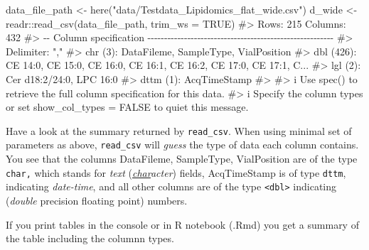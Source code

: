 \documentclass[
  letterpaper,
  DIV=11,
  numbers=noendperiod]{scrreprt}
\newenvironment{Shaded}{\begin{snugshade}}{\end{snugshade}}
\newcommand{\AttributeTok}[1]{\textcolor[rgb]{0.40,0.45,0.13}{#1}}
\newcommand{\CommentTok}[1]{\textcolor[rgb]{0.37,0.37,0.37}{#1}}
\newcommand{\ConstantTok}[1]{\textcolor[rgb]{0.56,0.35,0.01}{#1}}
\newcommand{\FunctionTok}[1]{\textcolor[rgb]{0.28,0.35,0.67}{#1}}
\newcommand{\NormalTok}[1]{\textcolor[rgb]{0.00,0.23,0.31}{#1}}
\newcommand{\OtherTok}[1]{\textcolor[rgb]{0.00,0.23,0.31}{#1}}
\newcommand{\SpecialCharTok}[1]{\textcolor[rgb]{0.37,0.37,0.37}{#1}}
\newcommand{\StringTok}[1]{\textcolor[rgb]{0.13,0.47,0.30}{#1}}
\begin{document}
\begin{Shaded}
\begin{Highlighting}[]
\NormalTok{data\_file\_path }\OtherTok{\textless{}{-}} \FunctionTok{here}\NormalTok{(}\StringTok{"data/Testdata\_Lipidomics\_flat\_wide.csv"}\NormalTok{)}
\NormalTok{d\_wide }\OtherTok{\textless{}{-}}\NormalTok{ readr}\SpecialCharTok{::}\FunctionTok{read\_csv}\NormalTok{(data\_file\_path, }\AttributeTok{trim\_ws =} \ConstantTok{TRUE}\NormalTok{)}
\CommentTok{\#\textgreater{} Rows: 215 Columns: 432}
\CommentTok{\#\textgreater{} {-}{-} Column specification {-}{-}{-}{-}{-}{-}{-}{-}{-}{-}{-}{-}{-}{-}{-}{-}{-}{-}{-}{-}{-}{-}{-}{-}{-}{-}{-}{-}{-}{-}{-}{-}{-}{-}{-}{-}{-}{-}{-}{-}{-}{-}{-}{-}{-}{-}{-}{-}{-}{-}{-}{-}{-}{-}{-}{-}}
\CommentTok{\#\textgreater{} Delimiter: ","}
\CommentTok{\#\textgreater{} chr    (3): DataFileme, SampleType, VialPosition}
\CommentTok{\#\textgreater{} dbl  (426): CE 14:0, CE 15:0, CE 16:0, CE 16:1, CE 16:2, CE 17:0, CE 17:1, C...}
\CommentTok{\#\textgreater{} lgl    (2): Cer d18:2/24:0, LPC 16:0}
\CommentTok{\#\textgreater{} dttm   (1): AcqTimeStamp}
\CommentTok{\#\textgreater{} }
\CommentTok{\#\textgreater{} i Use \textasciigrave{}spec()\textasciigrave{} to retrieve the full column specification for this data.}
\CommentTok{\#\textgreater{} i Specify the column types or set \textasciigrave{}show\_col\_types = FALSE\textasciigrave{} to quiet this message.}
\end{Highlighting}
\end{Shaded}

Have a look at the summary returned by \texttt{read\_csv}. When using
minimal set of parameters as above, \texttt{read\_csv} will \emph{guess}
the type of data each column contains. You see that the columns
DataFileme, SampleType, VialPosition are of the type \texttt{char,}
which stands for \emph{text} (\uline{\emph{char}}\emph{acter}) fields,
AcqTimeStamp is of type \texttt{dttm}, indicating \emph{date-time}, and
all other columns are of the type \texttt{\textless{}dbl\textgreater{}}
indicating (\emph{double} precision floating point) numbers.

If you print tables in the console or in R notebook (.Rmd) you get a
summary of the table including the columnn types.
\end{document}
